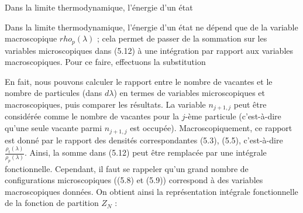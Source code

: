 Dans la limite thermodynamique, l'énergie d'un état

Dans la limite thermodynamique, l'énergie d'un état ne dépend que de la variable macroscopique \( rho_p(\lambda) \) ; cela permet de passer  
de la sommation sur les variables microscopiques dans (5.12) à une intégration par rapport aux variables macroscopiques.  
Pour ce faire, effectuons la substitution

En fait, nous pouvons calculer le rapport entre le nombre de vacantes et le nombre de particules (dans \( d\lambda \)) en termes de variables microscopiques et macroscopiques, puis comparer les résultats.  
La variable \( n_{j+1 , j} \) peut être considérée comme le nombre de vacantes pour la \( j \)-ème particule (c'est-à-dire qu'une seule vacante parmi \( n_{j+1,j} \) est occupée).  
Macroscopiquement, ce rapport est donné par le rapport des densités correspondantes (5.3), (5.5), c'est-à-dire \( \frac{\rho_t(\lambda)}{\rho_p(\lambda)} \).  
Ainsi, la somme dans (5.12) peut être remplacée par une intégrale fonctionnelle.  
Cependant, il faut se rappeler qu'un grand nombre de configurations microscopiques ((5.8) et (5.9)) correspond à des variables macroscopiques données.  
On obtient ainsi la représentation intégrale fonctionnelle de la fonction de partition \( Z_N \) :




